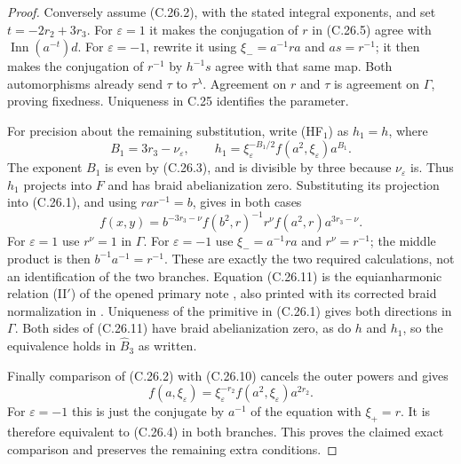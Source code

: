 \begin{proof}
Conversely assume (C.26.2), with the stated
integral exponents, and set $t=-2r_2+3r_3$.
For $\varepsilon=1$ it makes the conjugation
of $r$ in (C.26.5) agree with
$\operatorname{Inn}(a^{-t})d$.
For $\varepsilon=-1$, rewrite it using
$\xi_-=a^{-1}ra$ and $as=r^{-1}$;
it then makes the conjugation of $r^{-1}$
by $h^{-1}s$ agree with that same map.
Both automorphisms already send $\tau$ to
$\tau^\lambda$. Agreement on $r$ and $\tau$
is agreement on $\Gamma$, proving fixedness.
Uniqueness in C.25 identifies the parameter.

For precision about the remaining substitution,
write (HF$_1$) as $h_1=h$, where
\[
 B_1=3r_3-\nu_\varepsilon,\qquad
 h_1=\xi_\varepsilon^{-B_1/2}
                      f(a^2,\xi_\varepsilon)a^{B_1}.
 \tag{C.26.10}
\]
The exponent $B_1$ is even by (C.26.3), and
is divisible by three because
$\nu_\varepsilon$ is. Thus $h_1$ projects
into $F$ and has braid abelianization zero.
Substituting its projection into (C.26.1),
and using $rar^{-1}=b$, gives in both cases
\[
 f(x,y)=b^{-3r_3-\nu}f(b^2,r)^{-1}
                           r^\nu f(a^2,r)a^{3r_3-\nu}.
 \tag{C.26.11}
\]
For $\varepsilon=1$ use $r^\nu=1$ in
$\Gamma$. For $\varepsilon=-1$ use
$\xi_-=a^{-1}ra$ and $r^\nu=r^{-1}$;
the middle product is then $b^{-1}a^{-1}=r^{-1}$.
These are exactly the two required calculations,
not an identification of the two branches.
Equation (C.26.11) is the equianharmonic
relation (II$'$) of the opened primary note
\cite[Theorem 1]{PBC_NT2002}, also printed with
its corrected braid normalization in
\cite[\S5]{ROOT_NTY2010}.
Uniqueness of the primitive in (C.26.1) gives
both directions in $\Gamma$. Both sides of
(C.26.11) have braid abelianization zero,
as do $h$ and $h_1$, so the equivalence holds
in $\widehat B_3$ as written.

Finally comparison of (C.26.2) with
(C.26.10) cancels the outer powers and gives
\[
 f(a,\xi_\varepsilon)
       =\xi_\varepsilon^{-r_2}
                         f(a^2,\xi_\varepsilon)a^{2r_2}.
\]
For $\varepsilon=-1$ this is just the
conjugate by $a^{-1}$ of the equation with
$\xi_+=r$. It is therefore equivalent to
(C.26.4) in both branches. This proves the
claimed exact comparison and preserves the
remaining extra conditions.
\end{proof}

